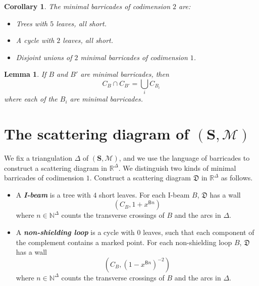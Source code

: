 \documentclass{amsart}
\newtheorem{corollary}[proposition]{Corollary}
\newtheorem{lemma}[proposition]{Lemma}
\newtheorem{conj}[proposition]{Conjecture}
\theoremstyle{definition}
\theoremstyle{remark}
\numberwithin{equation}{section}
\newcommand{\newword}[1]{\textbf{\emph{#1}}}
\newcommand{\0}{{\mathbf{0}}}
\newcommand{\M}{\mathcal{M}}
\renewcommand{\S}{\mathbf{S}}
\begin{document}
\begin{corollary}
The minimal barricades of codimension $2$ are:
\begin{itemize}
	\item Trees with $5$ leaves, all short.
	\item A cycle with $2$ leaves, all short.
	\item Disjoint unions of $2$ minimal barricades of codimension $1$.
\end{itemize}
\end{corollary}

\begin{lemma}
If $B$ and $B'$ are minimal barricades, then 
\[ C_B\cap C_{B'} = \bigcup _i C_{B_i} \]
where each of the $B_i$ are minimal barricades. 
\end{lemma}


\section{The scattering diagram of $(\S,\M)$}

We fix a triangulation $\Delta$ of $(\S,\M)$, and we use the language of barricades to construct a scattering diagram in $\mathbb{R}^\Delta$. We distinguish two kinds of minimal barricades of codimension $1$.
Construct a scattering diagram $\mathfrak{D}$ in $\mathbb{R}^\Delta$ as follows.
\begin{itemize}
	\item A \newword{I-beam} is a tree with $4$ short leaves. For each {I-beam} $B$, $\mathfrak{D}$ has a wall
	\[ (C_B, 1+x^{\mathsf{B}n} )\]
	where $n\in\mathbb{N}^\Delta$ counts the transverse crossings of $B$ and the arcs in $\Delta$.
	\item A \newword{non-shielding loop} is a cycle with $0$ leaves, such that each component of the complement contains a marked point. For each {non-shielding loop} $B$, $\mathfrak{D}$ has a wall
	\[ \left(C_B, (1-x^{\mathsf{B}n})^{-2} \right)\]
	where $n\in\mathbb{N}^\Delta$ counts the transverse crossings of $B$ and the arcs in $\Delta$.
\end{itemize}
\end{document}
